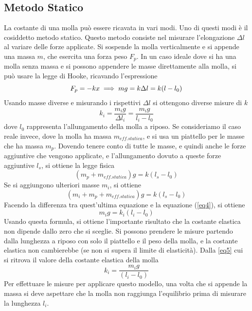 \documentclass[a4paper]{article}
\begin{document}
\subsection{Metodo Statico}
La costante di una molla può essere ricavata in vari modi. Uno di questi modi è il cosiddetto metodo statico. Questo metodo consiste nel misurare l'elongazione $\Delta l$ al variare delle forze applicate. Si sospende la molla verticalmente e si appende una massa $m$, che esercita una forza peso $F_p$. In un caso ideale dove si ha una molla senza massa e si possono appendere le masse direttamente alla molla, si può usare la legge di Hooke, ricavando l'espressione
\begin{equation}
    F_p = -kx \\
    \implies mg = k\Delta l = k(l-l_0)
\end{equation}
Usando masse diverse e misurando i rispettivi $\Delta l$ si ottengono diverse misure di $k$
\begin{equation}
    k_i=\frac{m_ig}{\Delta l_i}=\frac{m_ig}{l_i-l_0}
\end{equation}
dove $l_0$ rappresenta l'allungamento della molla a riposo. 
Se consideriamo il caso reale invece, dove la molla ha massa $m_{eff.statica}$, e si usa un piattello per le masse che ha massa $m_p$. Dovendo tenere conto di tutte le masse, e quindi anche le forze aggiuntive che vengono applicate, e l'allungamento dovuto a queste forze aggiuntive $l_s$, si ottiene la legge fisica
\begin{equation} \label{eq4}
    (m_p+m_{eff. statica})g=k(l_s-l_0)
\end{equation}
Se si aggiungono ulteriori masse $m_i$, si ottiene 
\begin{equation}
    (m_i+m_p+m_{eff. statica})g=k(l_s-l_0)
\end{equation}
Facendo la differenza tra quest'ultima equazione e la equazione (\ref{eq4}), si ottiene 
\begin{equation} \label{eq5}
    m_ig=k_i(l_i-l_0)
\end{equation}
Usando questa formula, si ottiene l'importante risultato che la costante elastica non dipende dallo zero che si sceglie. Si possono prendere le misure partendo dalla lunghezza a riposo con solo il piattello e il peso della molla, e la costante elastica non cambierebbe (se non si supera il limite di elasticità). Dalla \ref{eq5} cui si ritrova il valore della costante elastica della molla
\begin{equation}
    k_i=\frac{m_ig}{(l_i-l_0)}
\end{equation}
Per effettuare le misure per applicare questo modello, una volta che si appende la massa si deve aspettare che la molla non raggiunga l'equilibrio prima di misurare la lunghezza $l_i$.
\end{document}
